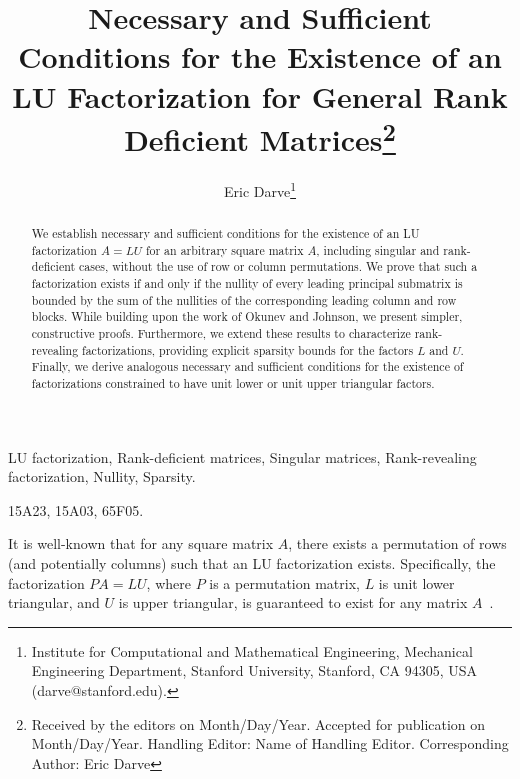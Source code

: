 \documentclass[10pt,twoside]{siamart1116}
\newcommand{\HE}{Name of Handling Editor}
\newcommand{\DoS}{Month/Day/Year}
\newcommand{\DoA}{Month/Day/Year}
\newcommand{\CA}{Eric Darve}
\newcommand{\Names}{Eric Darve}
\newcommand{\Title}{Necessary and Sufficient Conditions for the Existence of an LU Factorization for General Rank Deficient Matrices}
\numberwithin{theorem}{section}
\begin{document}
% 

%
\setcounter{page}{1}

\thispagestyle{empty}

\title{\Title\thanks{Received
		by the editors on \DoS.
		Accepted for publication on \DoA.
		Handling Editor: \HE. Corresponding Author: \CA}}

\author{
	Eric Darve\thanks{Institute for Computational and Mathematical Engineering,
		Mechanical Engineering Department,
		Stanford University,
		Stanford, CA 94305, USA
		(darve@stanford.edu).}
}


\maketitle

\begin{abstract}
	We establish necessary and sufficient conditions for the existence of an LU factorization $A=LU$ for an arbitrary square matrix $A$, including singular and rank-deficient cases, without the use of row or column permutations. We prove that such a factorization exists if and only if the nullity of every leading principal submatrix is bounded by the sum of the nullities of the corresponding leading column and row blocks. While building upon the work of Okunev and Johnson, we present simpler, constructive proofs. Furthermore, we extend these results to characterize rank-revealing factorizations, providing explicit sparsity bounds for the factors $L$ and $U$. Finally, we derive analogous necessary and sufficient conditions for the existence of factorizations constrained to have unit lower or unit upper triangular factors.
\end{abstract}

\begin{keywords}
	LU factorization, Rank-deficient matrices, Singular matrices, Rank-revealing factorization, Nullity, Sparsity.
\end{keywords}
\begin{AMS}
	15A23, 15A03, 65F05.
\end{AMS}

It is well-known that for any square matrix $A$, there exists a permutation of rows (and potentially columns) such that an LU factorization exists. Specifically, the factorization $PA = LU$, where $P$ is a permutation matrix, $L$ is unit lower triangular, and $U$ is upper triangular, is guaranteed to exist for any matrix $A$~\cite{higham_gaussian_2011,lu_numerical_2021}.
\end{document}
